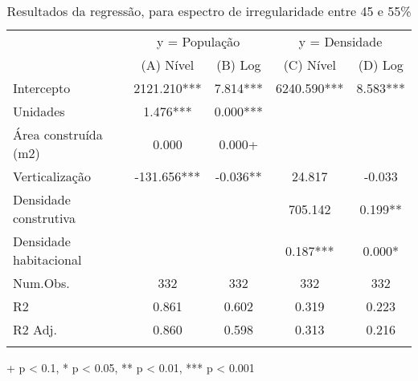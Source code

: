 \begin{table}[h]
\caption{Resultados da regressão, para espectro de irregularidade entre 45 e 55\%} 
\centering
\fontsize{10.0pt}{12pt}\selectfont
\begin{tabular*}{.9\linewidth}{@{\extracolsep{\fill}}lcccc}
\toprule
 & \multicolumn{2}{c}{y = População} & \multicolumn{2}{c}{y = Densidade} \\ 
\cmidrule(lr){2-3} \cmidrule(lr){4-5}
  & (A) Nível & (B) Log & (C) Nível & (D) Log \\ 
\midrule\addlinespace[2.5pt]
Intercepto & 2121.210*** & 7.814*** & 6240.590*** & 8.583*** \\ 
Unidades & 1.476*** & 0.000*** &  &  \\ 
Área construída (m2) & 0.000 & 0.000+ &  &  \\ 
Verticalização & -131.656*** & -0.036** & 24.817 & -0.033 \\ 
Densidade construtiva &  &  & 705.142 & 0.199** \\ 
{Densidade habitacional} & {} & {} & {0.187***} & {0.000*} \\ 
\midrule
Num.Obs. & 332 & 332 & 332 & 332 \\ 
R2 & 0.861 & 0.602 & 0.319 & 0.223 \\ 
R2 Adj. & 0.860 & 0.598 & 0.313 & 0.216 \\ 
\bottomrule\vspace{0pt}
\end{tabular*}
\label{tab:regressao-1}
\begin{minipage}{.9\linewidth}
+ p < 0.1, * p < 0.05, ** p < 0.01, *** p < 0.001\\
\end{minipage}
\end{table}

